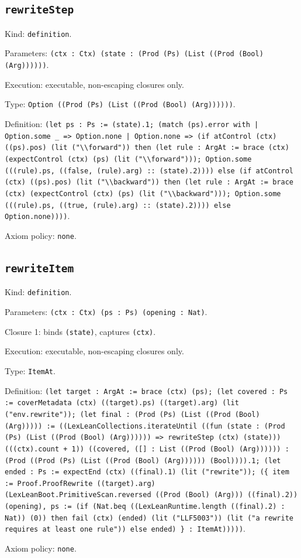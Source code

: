 \documentclass[11pt]{article}
\begin{document}
\subsection*{\texttt{rewriteStep}}
\noindent Kind: \texttt{definition}.\par
\noindent Parameters: \texttt{(ctx : Ctx) (state : (Prod (Ps) (List ((Prod (Bool) (Arg))))))}.\par
\noindent Execution: executable, non-escaping closures only.\par
\noindent Type: \texttt{Option ((Prod (Ps) (List ((Prod (Bool) (Arg))))))}.\par
\noindent Definition: \texttt{(let ps : Ps := (state).1; (match (ps).error with | Option.some \_ => Option.none | Option.none => (if atControl (ctx) ((ps).pos) (lit ("\textbackslash{}\textbackslash{}forward")) then (let rule : ArgAt := brace (ctx) (expectControl (ctx) (ps) (lit ("\textbackslash{}\textbackslash{}forward"))); Option.some (((rule).ps, ((false, (rule).arg) :: (state).2)))) else (if atControl (ctx) ((ps).pos) (lit ("\textbackslash{}\textbackslash{}backward")) then (let rule : ArgAt := brace (ctx) (expectControl (ctx) (ps) (lit ("\textbackslash{}\textbackslash{}backward"))); Option.some (((rule).ps, ((true, (rule).arg) :: (state).2)))) else Option.none))))}.\par
\noindent Axiom policy: \texttt{none}.\par
\subsection*{\texttt{rewriteItem}}
\noindent Kind: \texttt{definition}.\par
\noindent Parameters: \texttt{(ctx : Ctx) (ps : Ps) (opening : Nat)}.\par
\noindent Closure 1: binds \texttt{(state)}, captures \texttt{(ctx)}.\par
\noindent Execution: executable, non-escaping closures only.\par
\noindent Type: \texttt{ItemAt}.\par
\noindent Definition: \texttt{(let target : ArgAt := brace (ctx) (ps); (let covered : Ps := coverMetadata (ctx) ((target).ps) ((target).arg) (lit ("env.rewrite")); (let final : (Prod (Ps) (List ((Prod (Bool) (Arg))))) := ((LexLeanCollections.iterateUntil ((fun (state : (Prod (Ps) (List ((Prod (Bool) (Arg)))))) => rewriteStep (ctx) (state))) (((ctx).count + 1)) ((covered, ([] : List ((Prod (Bool) (Arg)))))) : (Prod ((Prod (Ps) (List ((Prod (Bool) (Arg)))))) (Bool)))).1; (let ended : Ps := expectEnd (ctx) ((final).1) (lit ("rewrite")); (\{ item := Proof.ProofRewrite ((target).arg) (LexLeanBoot.PrimitiveScan.reversed ((Prod (Bool) (Arg))) ((final).2)) (opening), ps := (if (Nat.beq ((LexLeanRuntime.length ((final).2) : Nat)) (0)) then fail (ctx) (ended) (lit ("LLF5003")) (lit ("a rewrite requires at least one rule")) else ended) \} : ItemAt)))))}.\par
\noindent Axiom policy: \texttt{none}.\par
\end{document}
